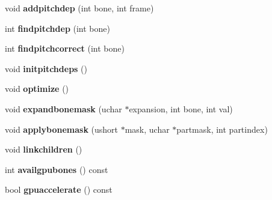 \begin{DoxyCompactItemize}
\mbox{\label{structskelmodel_1_1skeleton_ab29ede953e6ff4916cf55ba232463998}} 
void {\bfseries addpitchdep} (int bone, int frame)
\item 
\mbox{\label{structskelmodel_1_1skeleton_aaadb3a1e7897d1a0218b69cf9d210118}} 
int {\bfseries findpitchdep} (int bone)
\item 
\mbox{\label{structskelmodel_1_1skeleton_a717bd0f225f5a0b074f0faec787f9161}} 
int {\bfseries findpitchcorrect} (int bone)
\item 
\mbox{\label{structskelmodel_1_1skeleton_a7c8749de850257ce6a4ae2c727652e6e}} 
void {\bfseries initpitchdeps} ()
\item 
\mbox{\label{structskelmodel_1_1skeleton_ab6dddf610047f465acbe216f0a80db64}} 
void {\bfseries optimize} ()
\item 
\mbox{\label{structskelmodel_1_1skeleton_a3a5be8907604b67324f911ebf6fa175d}} 
void {\bfseries expandbonemask} (uchar $\ast$expansion, int bone, int val)
\item 
\mbox{\label{structskelmodel_1_1skeleton_a23090d2506712d31bb95ea27bfd65ec8}} 
void {\bfseries applybonemask} (ushort $\ast$mask, uchar $\ast$partmask, int partindex)
\item 
\mbox{\label{structskelmodel_1_1skeleton_a0d7496dcb73673290663ea4a36b0c0d6}} 
void {\bfseries linkchildren} ()
\item 
\mbox{\label{structskelmodel_1_1skeleton_a2e7a61acc3d0d18dd969154920816c65}} 
int {\bfseries availgpubones} () const
\item 
\mbox{\label{structskelmodel_1_1skeleton_a58ef91695ebcd773e49a020814481e35}} 
bool {\bfseries gpuaccelerate} () const
\item 
\mbox{\label{structskelmodel_1_1skeleton_a40e8f7926e0511a460ab21445bca4c7d}} 

\end{DoxyCompactItemize}
